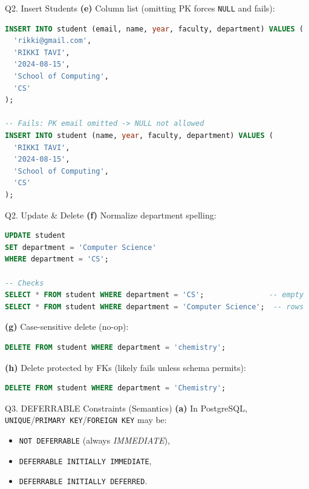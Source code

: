 \documentclass{beamer}
\begin{document}
\begin{frame}[fragile]{Q2. Insert Students}
\textbf{(e)} Column list (omitting PK forces \texttt{NULL} and fails):
\begin{lstlisting}[language=SQL]
INSERT INTO student (email, name, year, faculty, department) VALUES (
  'rikki@gmail.com',
  'RIKKI TAVI',
  '2024-08-15',
  'School of Computing',
  'CS'
);

-- Fails: PK email omitted -> NULL not allowed
INSERT INTO student (name, year, faculty, department) VALUES (
  'RIKKI TAVI',
  '2024-08-15',
  'School of Computing',
  'CS'
);
\end{lstlisting}
\end{frame}

\begin{frame}[fragile]{Q2. Update \& Delete}
\textbf{(f)} Normalize department spelling:
\begin{lstlisting}[language=SQL]
UPDATE student
SET department = 'Computer Science'
WHERE department = 'CS';

-- Checks
SELECT * FROM student WHERE department = 'CS';               -- empty
SELECT * FROM student WHERE department = 'Computer Science';  -- rows
\end{lstlisting}

\textbf{(g)} Case-sensitive delete (no-op):
\begin{lstlisting}[language=SQL]
DELETE FROM student WHERE department = 'chemistry';
\end{lstlisting}

\textbf{(h)} Delete protected by FKs (likely fails unless schema permits):
\begin{lstlisting}[language=SQL]
DELETE FROM student WHERE department = 'Chemistry';
\end{lstlisting}
\end{frame}

\begin{frame}{Q3. DEFERRABLE Constraints (Semantics)}
\textbf{(a)} In PostgreSQL, \texttt{UNIQUE}/\texttt{PRIMARY KEY}/\texttt{FOREIGN KEY} may be:
\begin{itemize}
  \item \texttt{NOT DEFERRABLE} (always \textit{IMMEDIATE}),
  \item \texttt{DEFERRABLE INITIALLY IMMEDIATE},
  \item \texttt{DEFERRABLE INITIALLY DEFERRED}.
\end{itemize}
\end{frame}
\end{document}
